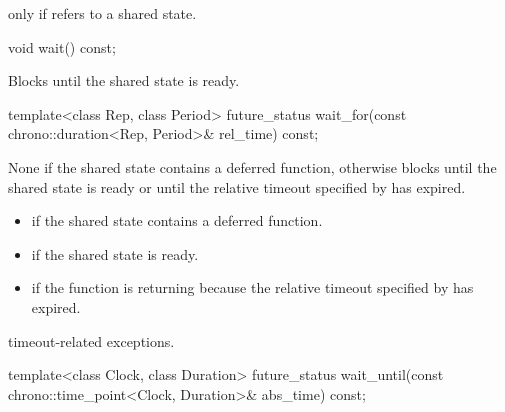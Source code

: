 \begin{itemdescr}
\pnum
\returns
{} only if  refers to a shared state.
\end{itemdescr}

%
\begin{itemdecl}
void wait() const;
\end{itemdecl}

\begin{itemdescr}
\pnum
{}%
\effects
Blocks until the shared state is ready.
\end{itemdescr}

%
\begin{itemdecl}
template<class Rep, class Period>
  future_status wait_for(const chrono::duration<Rep, Period>& rel_time) const;
\end{itemdecl}

\begin{itemdescr}
\pnum
{}%
\effects
None if the shared state contains a deferred function,
otherwise
blocks until the shared state is ready or until
the relative timeout specified by  has expired.

\pnum
\returns

\begin{itemize}
\item {} if the shared state contains a deferred
function.

\item {} if the shared state is ready.

\item {} if the function is returning because the
relative timeout
specified by  has expired.
\end{itemize}

\pnum
\throws
timeout-related exceptions.
\end{itemdescr}

%
\begin{itemdecl}
template<class Clock, class Duration>
  future_status wait_until(const chrono::time_point<Clock, Duration>& abs_time) const;
\end{itemdecl}

